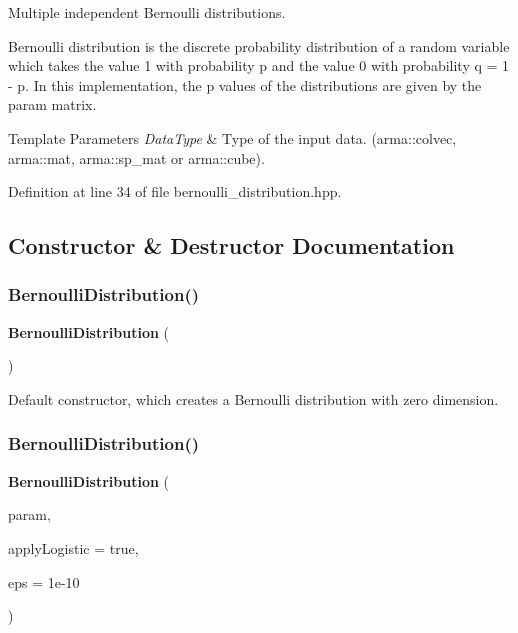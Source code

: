 Multiple independent Bernoulli distributions. 

Bernoulli distribution is the discrete probability distribution of a random variable which takes the value 1 with probability p and the value 0 with probability q = 1 -\/ p. In this implementation, the p values of the distributions are given by the param matrix.


\begin{DoxyTemplParams}{Template Parameters}
{\em Data\+Type} & Type of the input data. (arma\+::colvec, arma\+::mat, arma\+::sp\+\_\+mat or arma\+::cube). \\
\hline
\end{DoxyTemplParams}


Definition at line 34 of file bernoulli\+\_\+distribution.\+hpp.



\subsection{Constructor \& Destructor Documentation}
\mbox{\label{classmlpack_1_1ann_1_1BernoulliDistribution_a88d6abf9fc36d7f6975a64a14a6c03a6}} 
\subsubsection{Bernoulli\+Distribution()\hspace{0.1cm}{\footnotesize\ttfamily [1/2]}}
{\footnotesize\ttfamily \textbf{ Bernoulli\+Distribution} (\begin{DoxyParamCaption}{ }\end{DoxyParamCaption})}



Default constructor, which creates a Bernoulli distribution with zero dimension. 

\mbox{\label{classmlpack_1_1ann_1_1BernoulliDistribution_a81bf5f2daf02b0a98d86ea65f24bc69b}} 
\subsubsection{Bernoulli\+Distribution()\hspace{0.1cm}{\footnotesize\ttfamily [2/2]}}
{\footnotesize\ttfamily \textbf{ Bernoulli\+Distribution} (\begin{DoxyParamCaption}\item[{const Data\+Type \&}]{param,  }\item[{const bool}]{apply\+Logistic = {\ttfamily true},  }\item[{const double}]{eps = {\ttfamily 1e-\/10} }\end{DoxyParamCaption})}



